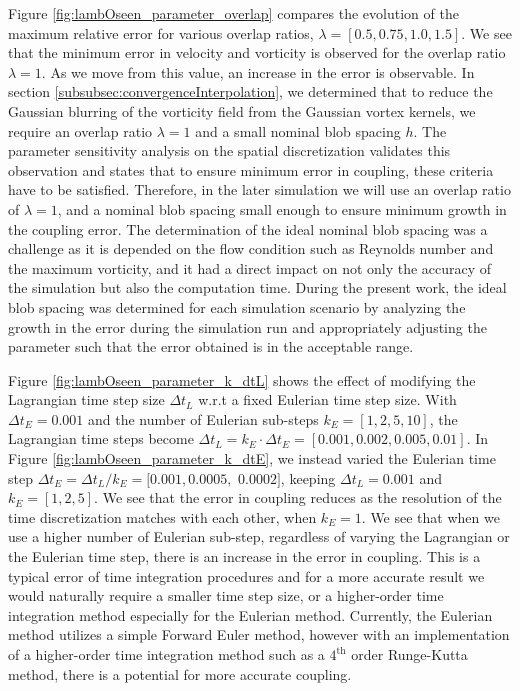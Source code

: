 Figure \ref{fig:lambOseen_parameter_overlap} compares the evolution of the maximum relative error for various overlap ratios, $\lambda = [0.5, 0.75, 1.0, 1.5]$. We see that the minimum error in velocity and vorticity is observed for the overlap ratio $\lambda = 1$. As we move from this value, an increase in the error is observable. In section \ref{subsubsec:convergenceInterpolation}, we determined that to reduce the Gaussian blurring of the vorticity field from the Gaussian vortex kernels, we require an overlap ratio $\lambda=1$ and a small nominal blob spacing $h$. The parameter sensitivity analysis on the spatial discretization validates this observation and states that to ensure minimum error in coupling, these criteria have to be satisfied. Therefore, in the later simulation we will use an overlap ratio of $\lambda=1$, and a nominal blob spacing small enough to ensure minimum growth in the coupling error. The determination of the ideal nominal blob spacing was a challenge as it is depended on the flow condition such as Reynolds number and the maximum vorticity, and it had a direct impact on not only the accuracy of the simulation but also the computation time. During the present work, the ideal blob spacing was determined for each simulation scenario by analyzing the growth in the error during the simulation run and appropriately adjusting the parameter such that the error obtained is in the acceptable range.

Figure \ref{fig:lambOseen_parameter_k_dtL} shows the effect of modifying the Lagrangian time step size $\Delta t_L$ w.r.t a fixed Eulerian time step size. With $\Delta t_E=0.001$ and the number of Eulerian sub-steps $k_E = [1,2,5,10]$, the Lagrangian time steps become $\Delta t_L = k_E\cdot\Delta t_E = [0.001,0.002,0.005,0.01]$. In Figure \ref{fig:lambOseen_parameter_k_dtE}, we instead varied the Eulerian time step $\Delta t_E = \Delta t_L/k_E = [0.001,0.0005,$ $0.0002]$, keeping $\Delta t_L=0.001$ and $k_E = [1,2,5]$. We see that the error in coupling reduces as the resolution of the time discretization matches with each other, when $k_E = 1$. We see that when we use a higher number of Eulerian sub-step, regardless of varying the Lagrangian or the Eulerian time step, there is an increase in the error in coupling. This is a typical error of time integration procedures and for a more accurate result we would naturally require a smaller time step size, or a higher-order time integration method especially for the Eulerian method. Currently, the Eulerian method utilizes a simple Forward Euler method, however with an implementation of a higher-order time integration method such as a $4^{\mathrm{th}}$ order Runge-Kutta method, there is a potential for more accurate coupling.


